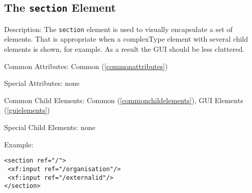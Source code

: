 \subsection{ The \texttt{section} Element}
\begin{description}
 \item Description: The \texttt{section} element is used to visually encapsulate a set of elements. That is appropriate when a complexType element with several child elements is shown, for example. As a result the GUI should be less cluttered.

 \item Common Attributes: Common (\ref{commonattributes})

 \item Special Attributes: none

 \item Common Child Elements: Common (\ref{commonchildelements}), GUI Elements (\ref{guielements})

 \item Special Child Elements: none

 \item Example: 

\begin{lstlisting}[caption=\texttt{section} Element]
<section ref="/">
 <xf:input ref="/organisation"/>
 <xf:input ref="/externalid"/>
</section>
\end{lstlisting}
\end{description}













